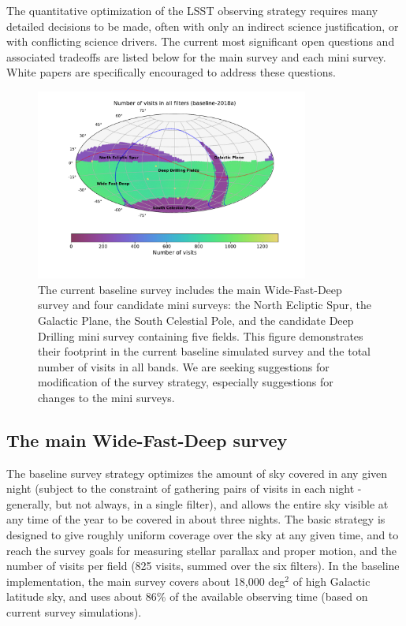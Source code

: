 \documentclass[DM,lsstdraft,toc,usenatbib]{lsstdoc}
\begin{document}
The quantitative optimization of the LSST observing strategy requires many 
detailed decisions to be made, often with only an indirect science justification,
or with conflicting science drivers.  The current most significant open questions and associated 
tradeoffs are listed below for the main survey and each mini survey. White papers are specifically 
encouraged to address these questions.

\begin{figure}[htb]
\centering
\includegraphics[width=0.8\textwidth]{Nvisits_all}
\caption{The current baseline survey includes the main Wide-Fast-Deep survey and four candidate mini surveys:
the North Ecliptic Spur, the Galactic Plane, the South Celestial Pole, and the candidate Deep Drilling mini survey 
containing five fields. 
This figure demonstrates their footprint in the current baseline simulated survey and the total number of visits in all bands.
We are seeking suggestions for modification of the survey strategy, especially suggestions for changes to the
mini surveys.}
\end{figure}

\subsection{The main Wide-Fast-Deep survey} 

The baseline survey strategy optimizes the amount of sky covered in any given night (subject to 
the constraint of gathering pairs of visits in each night - generally, but not always, in a single filter), 
and allows the entire sky visible at any time of the year to be covered in about three nights. 
The basic strategy is designed to give roughly uniform coverage over the sky at any given time, and to reach
the survey goals for measuring stellar parallax and proper motion, and the number of visits per 
field (825 visits, summed over the six filters). In the baseline implementation, the main survey 
covers about 18,000 deg$^2$ of high Galactic latitude sky, and uses about 86\% of the available 
observing time (based on current survey simulations). 
\end{document}
